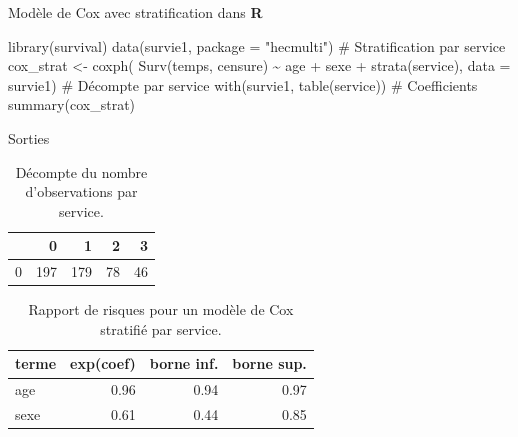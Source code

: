 \documentclass[
  ignorenonframetext,
]{beamer}
\newenvironment{Shaded}{\begin{snugshade}}{\end{snugshade}}
\newcommand{\AttributeTok}[1]{\textcolor[rgb]{0.40,0.45,0.13}{#1}}
\newcommand{\CommentTok}[1]{\textcolor[rgb]{0.37,0.37,0.37}{#1}}
\newcommand{\FunctionTok}[1]{\textcolor[rgb]{0.28,0.35,0.67}{#1}}
\newcommand{\NormalTok}[1]{\textcolor[rgb]{0.00,0.23,0.31}{#1}}
\newcommand{\OtherTok}[1]{\textcolor[rgb]{0.00,0.23,0.31}{#1}}
\newcommand{\SpecialCharTok}[1]{\textcolor[rgb]{0.37,0.37,0.37}{#1}}
\newcommand{\StringTok}[1]{\textcolor[rgb]{0.13,0.47,0.30}{#1}}
\begin{document}
\begin{frame}[fragile]{Modèle de Cox avec stratification dans
\textbf{R}}
\protect\hypertarget{moduxe8le-de-cox-avec-stratification-dans-r}{}
\begin{Shaded}
\begin{Highlighting}[numbers=left,,]
\FunctionTok{library}\NormalTok{(survival)}
\FunctionTok{data}\NormalTok{(survie1, }\AttributeTok{package =} \StringTok{"hecmulti"}\NormalTok{)}
\CommentTok{\# Stratification par service}
\NormalTok{cox\_strat }\OtherTok{\textless{}{-}} \FunctionTok{coxph}\NormalTok{(}
  \FunctionTok{Surv}\NormalTok{(temps, censure) }\SpecialCharTok{\textasciitilde{}}\NormalTok{ age }\SpecialCharTok{+}\NormalTok{ sexe }\SpecialCharTok{+} \FunctionTok{strata}\NormalTok{(service), }
  \AttributeTok{data =}\NormalTok{ survie1)}
\CommentTok{\# Décompte par service}
\FunctionTok{with}\NormalTok{(survie1, }\FunctionTok{table}\NormalTok{(service))}
\CommentTok{\# Coefficients}
\FunctionTok{summary}\NormalTok{(cox\_strat)}
\end{Highlighting}
\end{Shaded}
\end{frame}

\begin{frame}{Sorties}
\protect\hypertarget{sorties}{}
\hypertarget{tbl-nserv}{}
\begin{table}
\caption{\label{tbl-nserv}Décompte du nombre d'observations par service. }\tabularnewline

\centering
\begin{tabular}{lrrrr}
\toprule
  & 0 & 1 & 2 & 3\\
\midrule
0 & 197 & 179 & 78 & 46\\
\bottomrule
\end{tabular}
\end{table}

\hypertarget{tbl-coxstratif}{}
\begin{table}
\caption{\label{tbl-coxstratif}Rapport de risques pour un modèle de Cox stratifié par service. }\tabularnewline

\centering
\begin{tabular}{lrrr}
\toprule
terme & exp(coef) & borne inf. & borne sup.\\
\midrule
age & 0.96 & 0.94 & 0.97\\
sexe & 0.61 & 0.44 & 0.85\\
\bottomrule
\end{tabular}
\end{table}
\end{frame}
\end{document}
